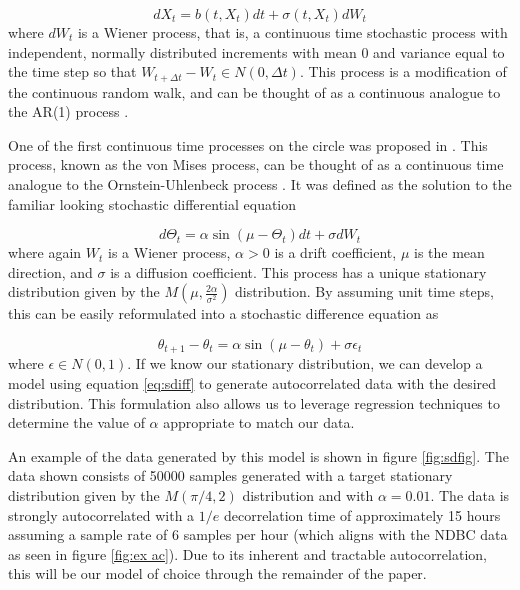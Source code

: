 \documentclass[12pt]{article}
\numberwithin{equation}{section}
\numberwithin{figure}{section}
\begin{document}
\begin{equation}\label{eq:ornuhl}
d X_t = b(t, X_t)dt+\sigma(t,X_t)dW_t
\end{equation}
where $dW_t$ is a Wiener process, that is, a continuous time stochastic process with independent, normally distributed increments with mean $0$ and variance equal to the time step so that $W_{t+\Delta t}-W_t \in N(0,\Delta t)$. This process is a modification of the continuous random walk, and can be thought of as a continuous analogue to the AR(1) process \cite{oksendal}.

One of the first continuous time processes on the circle was proposed in \cite{Kent1}. This process, known as the von Mises process, can be thought of as a continuous time analogue to the Ornstein-Uhlenbeck process \cite{Garcia}. It was defined as the solution to the familiar looking stochastic differential equation

\begin{equation}\label{eq:vmp}
d \Theta_t = \alpha \sin(\mu - \Theta_t)dt+\sigma dW_t
\end{equation}
where again $W_t$ is a Wiener process, $\alpha>0$ is a drift coefficient, $\mu$ is the mean direction, and $\sigma$ is a diffusion coefficient. This process has a unique stationary distribution given by the $M(\mu, \frac{2\alpha}{\sigma^2})$ distribution. By assuming unit time steps, this can be easily reformulated into a stochastic difference equation as

\begin{equation}\label{eq:sdiff}
\theta_{t+1} - \theta_t = \alpha \sin( \mu - \theta_t )+\sigma \epsilon_t
\end{equation}
where $\epsilon \in N(0,1)$. If we know our stationary distribution, we can develop a model using equation \ref{eq:sdiff} to generate autocorrelated data with the desired distribution. This formulation also allows us to leverage regression techniques to determine the value of $\alpha$ appropriate to match our data. 

An example of the data generated by this model is shown in figure \ref{fig:sdfig}. The data shown consists of 50000 samples generated with a target stationary distribution given by the $M(\pi/4, 2)$ distribution and with $\alpha = 0.01$. The data is strongly autocorrelated with a $1/e$ decorrelation time of approximately 15 hours assuming a sample rate of 6 samples per hour (which aligns with the NDBC data as seen in figure \ref{fig:ex ac}). Due to its inherent and tractable autocorrelation, this will be our model of choice through the remainder of the paper. 
\end{document}
